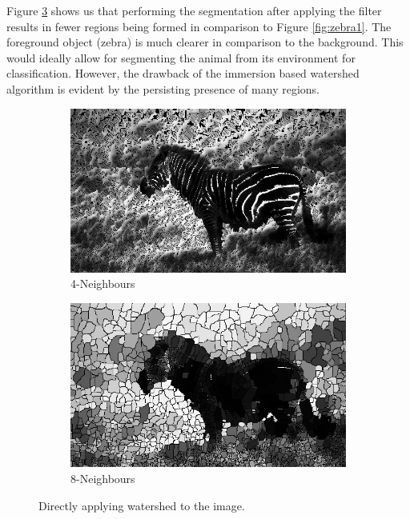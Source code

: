 \documentclass{article}
\begin{document}
\begin{flushleft}
Figure \ref{fig:zebra2} shows us that performing the segmentation after applying the filter results in fewer regions being formed in comparison to Figure \ref{fig:zebra1}. The foreground object (zebra) is much clearer in comparison to the background. This would ideally allow for segmenting the animal from its environment for classification. \newline \newline
However, the drawback of the immersion based watershed algorithm is evident by the persisting presence of many regions.  
\end{flushleft}

\begin{figure}[H]
\centering
\begin{subfigure}{10cm}
  \centering
  \includegraphics[scale=0.4]{experiments/zebra/zebraBL_4.jpg}
  \caption{4-Neighbours}
  \label{fig:zebra_5}
\end{subfigure}    
\begin{subfigure}{9cm}
  \centering
  \includegraphics[scale=0.4]{experiments/zebra/zebraBL_8.jpg}
  \caption{8-Neighbours}
  \label{fig:zebra_6}
\end{subfigure}
\label{fig:zebra2}
\caption{Directly applying watershed to the image.}
\end{figure}
\end{document}

